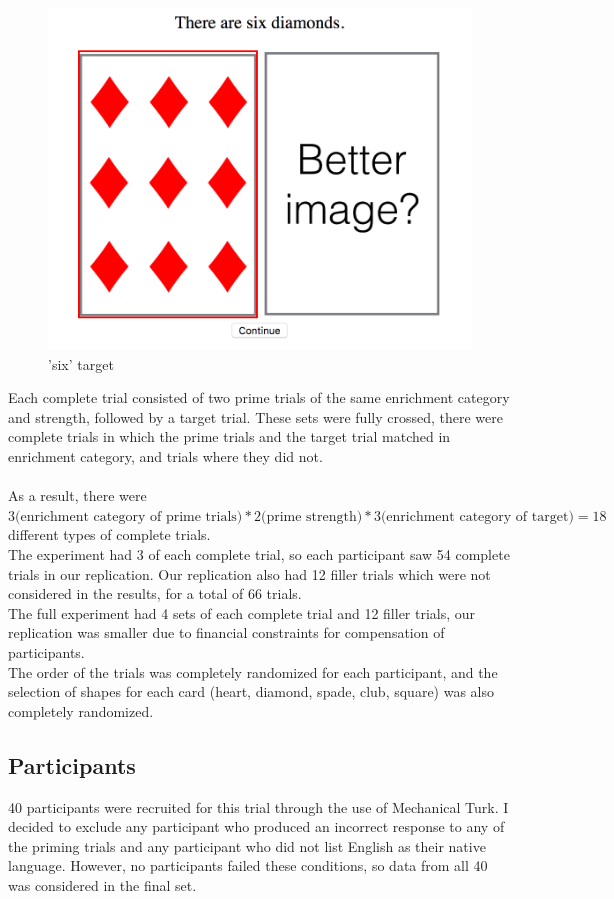 \documentclass[]{article}
\begin{document}
\begin{figure}[h]
\begin{minipage}[b]{0.3\textwidth}
\includegraphics[width=\textwidth]{six_test.png} 
\caption{'six' target }
\end{minipage}
\end{figure}

Each complete trial consisted of two prime trials of the same enrichment category and strength, followed by a target trial. These sets were fully crossed, there were complete trials in which the prime trials and the target trial matched in enrichment category, and trials where they did not.\\
\\
 As a result, there were $3 \text{(enrichment category of prime trials)} * 2 \text{(prime strength)} * 3 \text{(enrichment category of target)} = 18$ different types of complete trials. \\
The experiment had 3 of each complete trial, so each participant saw 54 complete trials in our replication. Our replication also had 12 filler trials which were not considered in the results, for a total of 66 trials. \\
The full experiment had 4 sets of each complete trial and 12 filler trials, our replication was smaller due to financial constraints for compensation of participants.\\
The order of the trials was completely randomized for each participant, and the selection of shapes for each card (heart, diamond, spade, club, square) was also completely randomized.



\subsection*{Participants}
40 participants were recruited for this trial through the use of Mechanical Turk. 
I decided to exclude any participant who produced an incorrect response to any of the priming trials and any participant who did not list English as their native language. However, no participants failed these conditions, so data from all 40 was considered in the final set. 
\end{document}
